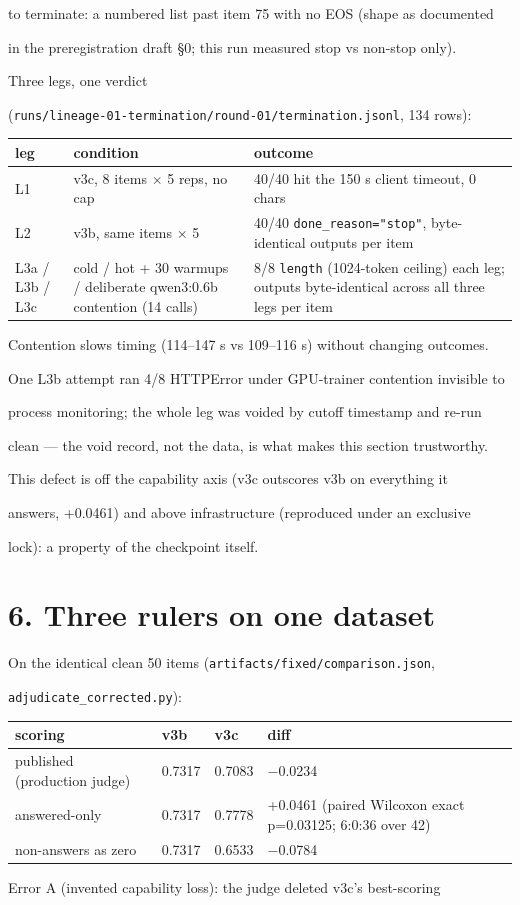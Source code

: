 \documentclass[11pt,a4paper]{article}
\begin{document}
to terminate: a numbered list past item 75 with no EOS (shape as documented

in the preregistration draft §0; this run measured stop vs non-stop only).

Three legs, one verdict

(\texttt{runs/lineage-01-termination/round-01/termination.jsonl}, 134 rows):

\begin{center}\small\begin{tabular}{l|l|l}
\hline
leg & condition & outcome \\ \hline
L1 & v3c, 8 items × 5 reps, no cap & 40/40 hit the 150 s client timeout, 0 chars \\ \hline
L2 & v3b, same items × 5 & 40/40 \texttt{done\_reason="stop"}, byte-identical outputs per item \\ \hline
L3a / L3b / L3c & cold / hot + 30 warmups / deliberate qwen3:0.6b contention (14 calls) & 8/8 \texttt{length} (1024-token ceiling) each leg; outputs byte-identical across all three legs per item \\ \hline
\end{tabular}\end{center}
Contention slows timing (114–147 s vs 109–116 s) without changing outcomes.

One L3b attempt ran 4/8 HTTPError under GPU-trainer contention invisible to

process monitoring; the whole leg was voided by cutoff timestamp and re-run

clean — the void record, not the data, is what makes this section trustworthy.

This defect is off the capability axis (v3c outscores v3b on everything it

answers, +0.0461) and above infrastructure (reproduced under an exclusive

lock): a property of the checkpoint itself.

\section*{6. Three rulers on one dataset}
On the identical clean 50 items (\texttt{artifacts/fixed/comparison.json},

\texttt{adjudicate\_corrected.py}):

\begin{center}\small\begin{tabular}{l|l|l|l}
\hline
scoring & v3b & v3c & diff \\ \hline
published (production judge) & 0.7317 & 0.7083 & −0.0234 \\ \hline
answered-only & 0.7317 & 0.7778 & +0.0461 (paired Wilcoxon exact p=0.03125; 6:0:36 over 42) \\ \hline
non-answers as zero & 0.7317 & 0.6533 & −0.0784 \\ \hline
\end{tabular}\end{center}
Error A (invented capability loss): the judge deleted v3c's best-scoring
\end{document}
